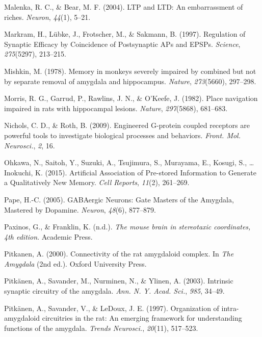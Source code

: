 \documentclass[12pt,a4paperpaper,]{report}
\begin{document}
\hypertarget{ref-malenkaux5fltpux5f2004}{}
Malenka, R. C., \& Bear, M. F. (2004). LTP and LTD: An embarrassment of
riches. \emph{Neuron}, \emph{44}(1), 5--21.

\hypertarget{ref-markramux5fregulationux5f1997}{}
Markram, H., Lübke, J., Frotscher, M., \& Sakmann, B. (1997). Regulation
of Synaptic Efficacy by Coincidence of Postsynaptic APs and EPSPs.
\emph{Science}, \emph{275}(5297), 213--215.

\hypertarget{ref-mishkinux5fmemoryux5f1978}{}
Mishkin, M. (1978). Memory in monkeys severely impaired by combined but
not by separate removal of amygdala and hippocampus. \emph{Nature},
\emph{273}(5660), 297--298.

\hypertarget{ref-morrisux5fplaceux5f1982-1}{}
Morris, R. G., Garrud, P., Rawlins, J. N., \& O'Keefe, J. (1982). Place
navigation impaired in rats with hippocampal lesions. \emph{Nature},
\emph{297}(5868), 681--683.

\hypertarget{ref-nicholsux5fengineeredux5f2009}{}
Nichols, C. D., \& Roth, B. (2009). Engineered G-protein coupled
receptors are powerful tools to investigate biological processes and
behaviors. \emph{Front. Mol. Neurosci.}, \emph{2}, 16.

\hypertarget{ref-ohkawaux5fartificialux5f2015}{}
Ohkawa, N., Saitoh, Y., Suzuki, A., Tsujimura, S., Murayama, E., Kosugi,
S., \ldots{} Inokuchi, K. (2015). Artificial Association of Pre-stored
Information to Generate a Qualitatively New Memory. \emph{Cell Reports},
\emph{11}(2), 261--269.

\hypertarget{ref-papeux5fgabaergicux5f2005}{}
Pape, H.-C. (2005). GABAergic Neurons: Gate Masters of the Amygdala,
Mastered by Dopamine. \emph{Neuron}, \emph{48}(6), 877--879.

\hypertarget{ref-paxinosux5fmouseux5f2010}{}
Paxinos, G., \& Franklin, K. (n.d.). \emph{The mouse brain in
stereotaxic coordinates, 4th edition}. Academic Press.

\hypertarget{ref-pitkanenux5fconnectivityux5f2000}{}
Pitkanen, A. (2000). Connectivity of the rat amygdaloid complex. In
\emph{The Amygdala} (2nd ed.). Oxford University Press.

\hypertarget{ref-pitkanenux5fintrinsicux5f2003}{}
Pitkänen, A., Savander, M., Nurminen, N., \& Ylinen, A. (2003).
Intrinsic synaptic circuitry of the amygdala. \emph{Ann. N. Y. Acad.
Sci.}, \emph{985}, 34--49.

\hypertarget{ref-pitkanenux5forganizationux5f1997}{}
Pitkänen, A., Savander, V., \& LeDoux, J. E. (1997). Organization of
intra-amygdaloid circuitries in the rat: An emerging framework for
understanding functions of the amygdala. \emph{Trends Neurosci.},
\emph{20}(11), 517--523.
\end{document}
